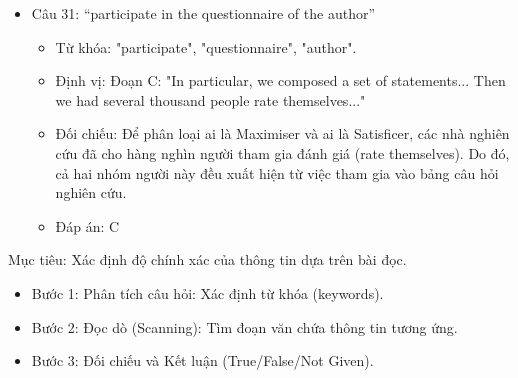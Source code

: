 \documentclass{../templateReading/cdreading}
\begin{document}
\begin{itemize}
\begin{itemize}
\item Đáp án: A
\end{itemize}
\item Câu 31: “participate in the questionnaire of the author”
\begin{itemize}
\item Từ khóa: "participate", "questionnaire", "author".
\item Định vị: Đoạn C: "In particular, we composed a set of statements... Then we had several thousand people rate themselves..."
\item Đối chiếu: Để phân loại ai là Maximiser và ai là Satisficer, các nhà nghiên cứu đã cho hàng nghìn người tham gia đánh giá (rate themselves). Do đó, cả hai nhóm người này đều xuất hiện từ việc tham gia vào bảng câu hỏi nghiên cứu.
\item Đáp án: C
\end{itemize}
\end{itemize}


Mục tiêu: Xác định độ chính xác của thông tin dựa trên bài đọc.

\begin{itemize}
\item Bước 1: Phân tích câu hỏi: Xác định từ khóa (keywords).
\item Bước 2: Đọc dò (Scanning): Tìm đoạn văn chứa thông tin tương ứng.
\item Bước 3: Đối chiếu và Kết luận (True/False/Not Given).
\end{itemize}
\end{document}
